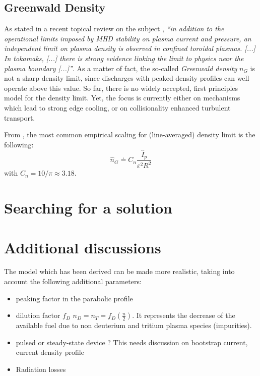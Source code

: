 \subsection{Greenwald Density}
As stated in a recent topical review on the subject \cite{Greenwald2002}, \emph{``in addition to the operational limits imposed by MHD stability on plasma current and pressure, an independent limit on plasma density is observed in confined toroidal plasmas. [...] In tokamaks, [...] there is strong evidence linking the limit to physics near the plasma boundary [...]''}. As a matter of fact, the so-called \textit{Greenwald density} $n_G$ is not a sharp density limit, since discharges with peaked density profiles can well operate above this value. So far, there is no widely accepted, first principles model for the density limit. Yet, the focus is currently either on mechanisms which lead to strong edge cooling, or on collisionality enhanced turbulent transport.

From \cite[eq.(14.146)]{Freidberg2007}, the most common empirical scaling for (line-averaged) density limit is the following:
\begin{equation}
\boxed{\hat n_G \doteq C_n \frac{\hat I_p}{\varepsilon^2 R^2}  }
\label{eq:greenwald_density}
\end{equation}
with $C_n = 10/\pi \approx 3.18$.



\section{Searching for a solution}



\section{Additional discussions}
The model which has been derived can be made more realistic, taking into account the following additional parameters:
\begin{itemize}
	\item peaking factor in the parabolic profile
	\item dilution factor $f_D$ $n_D = n_T = f_D \left( \frac{n}{2} \right)$. 
	It represents the decrease of the available fuel due to non deuterium and tritium plasma species (impurities).
	\item pulsed or steady-state device ? This needs discussion on bootstrap current, current density profile
	\item Radiation losses
\end{itemize} 
